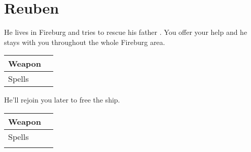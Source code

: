 \section{Reuben}
\label{char:reuben}


He lives in Fireburg and tries to rescue his father . You offer your help and he stays with you throughout the whole Fireburg area.

\bigskip
\begin{tabular}{ l | l }
	Weapon & \nameref{weapon:morning_star} \\
	\hline
	Spells & \nameref{spell:life}
\end{tabular}
\bigskip

\vspace{1em}

He’ll rejoin you later to free the ship.

\bigskip
\begin{tabular}{ l | l }
	Weapon & \nameref{weapon:morning_star} \\
	\hline
	Spells & \nameref{spell:life} \\
	& \nameref{spell:white}
\end{tabular}
\bigskip
